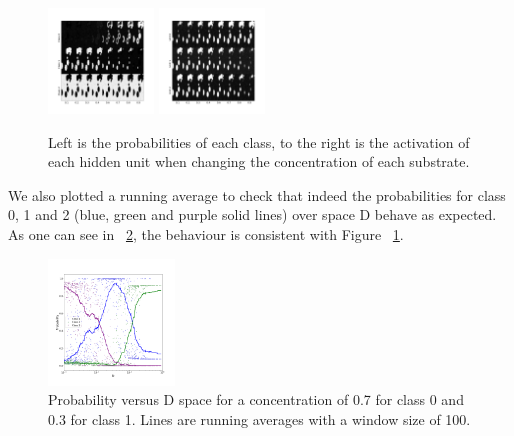 \documentclass{article}
\begin{document}
\begin{figure}[H]
	\centering
	\includegraphics[width=0.25\textwidth]{DNN_prop_im.png} \hspace*{-.5cm}
	\includegraphics[width=0.25\textwidth]{DNN_sigmoid_im.png}
	\caption{Left is the probabilities of each class, to the right is the activation of each hidden unit when changing the concentration of each substrate.}
    \label{fig:activations}
\end{figure}
%
We also plotted a running average to check that indeed the probabilities for class 0, 1 and 2 (blue, green and purple solid lines) over space D behave as expected. As one can see in ~\ref{fig:Dspace}, the behaviour is consistent with Figure ~\ref{fig:activations}.
%
\begin{figure}[H]
	\centering
	\includegraphics[width=0.3\textwidth]{DNN_D_vs_prob_6_2.png}
	\caption{Probability versus D space for a concentration of 0.7 for class 0 and 0.3 for class 1. Lines are running averages with a window size of 100.}
	\label{fig:Dspace}
\end{figure}
\end{document}
